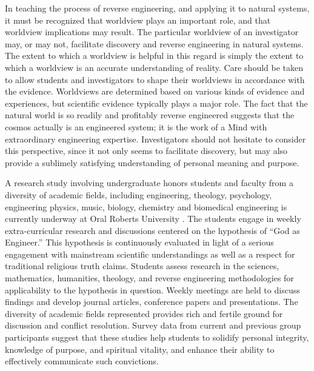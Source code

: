 In teaching the process of reverse engineering, and applying it to
natural systems, it must be recognized that worldview plays an
important role, and that worldview implications may result. The
particular worldview of an investigator may, or may not, facilitate
discovery and reverse engineering in natural systems. The extent to
which a worldview is helpful in this regard is simply the extent to
which a worldview is an accurate understanding of reality. Care should
be taken to allow students and investigators to shape their worldviews
in accordance with the evidence. Worldviews are determined based on
various kinds of evidence and experiences, but scientific evidence
typically plays a major role. The fact that the natural world is so
readily and profitably reverse engineered suggests that the cosmos
actually is an engineered system; it is the work of a Mind with
extraordinary engineering expertise. Investigators should not hesitate
to consider this perspective, since it not only seems to facilitate
discovery, but may also provide a sublimely satisfying understanding of
personal meaning and purpose.

A research study involving undergraduate honors students and faculty
from a diversity of academic fields, including engineering, theology,
psychology, engineering physics, music, biology, chemistry and
biomedical engineering is currently underway at Oral Roberts
University \citep{halsmerbeck2012}. The students engage in weekly
extra-curricular research and discussions centered on the hypothesis of
“God as Engineer.” This hypothesis is continuously evaluated in light
of a serious engagement with mainstream scientific understandings as
well as a respect for traditional religious truth claims. Students
assess research in the sciences, mathematics, humanities, theology, and
reverse engineering methodologies for applicability to the hypothesis
in question. Weekly meetings are held to discuss findings and develop
journal articles, conference papers and presentations. The diversity of
academic fields represented provides rich and fertile ground for
discussion and conflict resolution. Survey data from current and
previous group participants suggest that these studies help students to
solidify personal integrity, knowledge of purpose, and spiritual
vitality, and enhance their ability to effectively communicate such
convictions.

